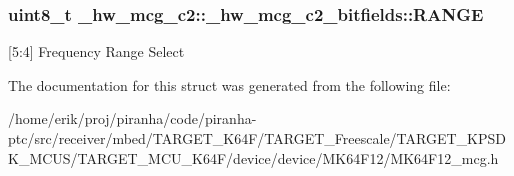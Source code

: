 \subsubsection[{\texorpdfstring{R\+A\+N\+GE}{RANGE}}]{\setlength{\rightskip}{0pt plus 5cm}uint8\+\_\+t \+\_\+hw\+\_\+mcg\+\_\+c2\+::\+\_\+hw\+\_\+mcg\+\_\+c2\+\_\+bitfields\+::\+R\+A\+N\+GE}\hypertarget{struct__hw__mcg__c2_1_1__hw__mcg__c2__bitfields_aedddb4ddd2f8944f3d94e4efb99b8783}{}\label{struct__hw__mcg__c2_1_1__hw__mcg__c2__bitfields_aedddb4ddd2f8944f3d94e4efb99b8783}
\mbox{[}5\+:4\mbox{]} Frequency Range Select 

The documentation for this struct was generated from the following file\+:\begin{DoxyCompactItemize}
\item 
/home/erik/proj/piranha/code/piranha-\/ptc/src/receiver/mbed/\+T\+A\+R\+G\+E\+T\+\_\+\+K64\+F/\+T\+A\+R\+G\+E\+T\+\_\+\+Freescale/\+T\+A\+R\+G\+E\+T\+\_\+\+K\+P\+S\+D\+K\+\_\+\+M\+C\+U\+S/\+T\+A\+R\+G\+E\+T\+\_\+\+M\+C\+U\+\_\+\+K64\+F/device/device/\+M\+K64\+F12/M\+K64\+F12\+\_\+mcg.\+h\end{DoxyCompactItemize}
